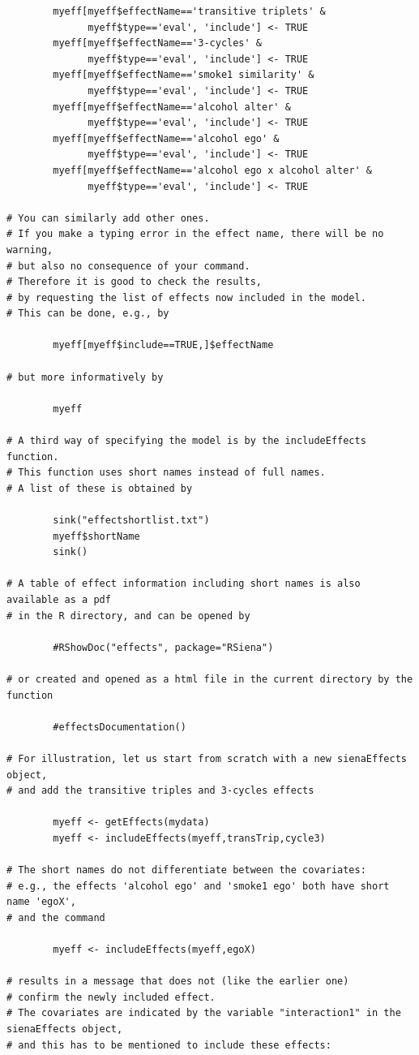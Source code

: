 \documentclass[a4paper,fleqn]{article}
\newcommand{\+}{\, + \,}
\begin{document}
{\begin{verbatim}
        myeff[myeff$effectName=='transitive triplets' &
              myeff$type=='eval', 'include'] <- TRUE
        myeff[myeff$effectName=='3-cycles' &
              myeff$type=='eval', 'include'] <- TRUE
        myeff[myeff$effectName=='smoke1 similarity' &
              myeff$type=='eval', 'include'] <- TRUE
        myeff[myeff$effectName=='alcohol alter' &
              myeff$type=='eval', 'include'] <- TRUE
        myeff[myeff$effectName=='alcohol ego' &
              myeff$type=='eval', 'include'] <- TRUE
        myeff[myeff$effectName=='alcohol ego x alcohol alter' &
              myeff$type=='eval', 'include'] <- TRUE

# You can similarly add other ones.
# If you make a typing error in the effect name, there will be no warning,
# but also no consequence of your command.
# Therefore it is good to check the results,
# by requesting the list of effects now included in the model.
# This can be done, e.g., by

        myeff[myeff$include==TRUE,]$effectName

# but more informatively by

        myeff

# A third way of specifying the model is by the includeEffects function.
# This function uses short names instead of full names.
# A list of these is obtained by

        sink("effectshortlist.txt")
        myeff$shortName
        sink()

# A table of effect information including short names is also available as a pdf
# in the R directory, and can be opened by

        #RShowDoc("effects", package="RSiena")

# or created and opened as a html file in the current directory by the function

        #effectsDocumentation()

# For illustration, let us start from scratch with a new sienaEffects object,
# and add the transitive triples and 3-cycles effects

        myeff <- getEffects(mydata)
        myeff <- includeEffects(myeff,transTrip,cycle3)

# The short names do not differentiate between the covariates:
# e.g., the effects 'alcohol ego' and 'smoke1 ego' both have short name 'egoX',
# and the command

        myeff <- includeEffects(myeff,egoX)

# results in a message that does not (like the earlier one)
# confirm the newly included effect.
# The covariates are indicated by the variable "interaction1" in the sienaEffects object,
# and this has to be mentioned to include these effects:


\end{verbatim}}
\end{document}

